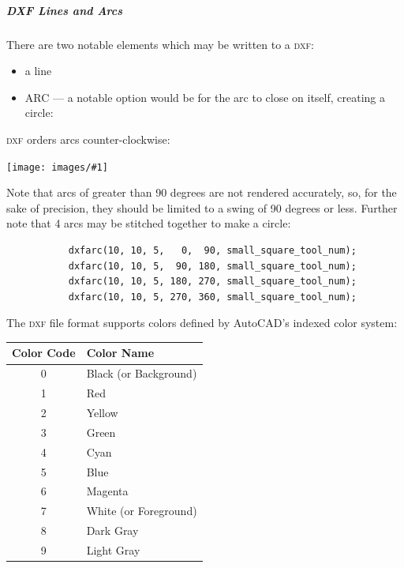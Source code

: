 \documentclass{ltxdoc}
\newcommand{\includeimage}[1]{\bigskip\noindent\texttt{[image: images/\#1]}\bigskip}
\begin{document}
\subparagraph*{DXF Lines and Arcs}%
 
There are two notable elements which may be written to a \textsc{dxf}:

\begin{itemize}
 \item a line %
 \item ARC --- a notable option would be for the arc to close on itself, creating a circle:
\end{itemize}
 
\textsc{dxf} orders arcs counter-clockwise:

\includeimage{arcs_circle_degrees.pdf}%

Note that arcs of greater than 90 degrees are not rendered accurately, so, for the sake of precision, they should be limited to a swing of 90 degrees or less. Further note that 4 arcs may be stitched together to make a circle:
 
\begin{verbatim}
           dxfarc(10, 10, 5,   0,  90, small_square_tool_num);
           dxfarc(10, 10, 5,  90, 180, small_square_tool_num);
           dxfarc(10, 10, 5, 180, 270, small_square_tool_num);
           dxfarc(10, 10, 5, 270, 360, small_square_tool_num);
\end{verbatim}
 
%
%

The \textsc{dxf} file format supports colors defined by AutoCAD's indexed color system:

\begin{center}
\noindent\begin{tabular}{cl}
Color Code & Color Name \\
\toprule
 0 & Black (or Background)  \\
 1 & Red \\
 2 & Yellow \\
 3 & Green  \\
 4 & Cyan  \\
 5 & Blue \\
 6 & Magenta \\ 
 7 & White (or Foreground)\\
 8 & Dark Gray \\ 
 9 & Light Gray \\\bottomrule
\end{tabular}
\end{center}
\end{document}
